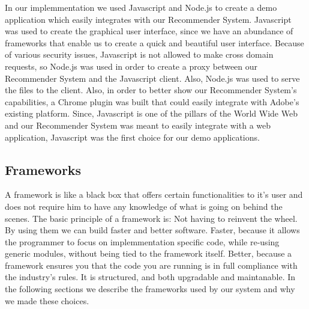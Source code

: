 In our implemmentation we used Javascript and Node.js to create a demo application which easily integrates with our Recommender System. Javascript was used to create the graphical user interface, since we have an abundance of frameworks that enable us to create a quick and beautiful user interface. Because of various security issues, Javascript is not allowed to make cross domain requests, so Node.js was used in order to create a proxy between our Recommender System and the Javascript client. Also, Node.js was used to serve the files to the client.
Also, in order to better show our Recommender System's capabilities, a Chrome plugin was built that could easily integrate with Adobe's existing platform.
Since, Javascript is one of the pillars of the World Wide Web and our Recommender System was meant to easily integrate with a web application, Javascript was the first choice for our demo applications.


\subsection{Frameworks}
\label{sec:frameworks}
A framework is like a black box that offers certain functionalities to it's user and does not require him to have any knowledge of what is going on behind the scenes.
The basic principle of a framework is: Not having to reinvent the wheel. By using them we can build faster and better software.
Faster, because it allows the programmer to focus on implemmentation specific code, while re-using generic modules, without being tied to the framework itself.
Better, because a framework ensures you that the code you are running is in full compliance with the industry's rules. It is structured, and both upgradable and maintanable.
In the following sections we describe the frameworks used by our system and why we made these choices.

